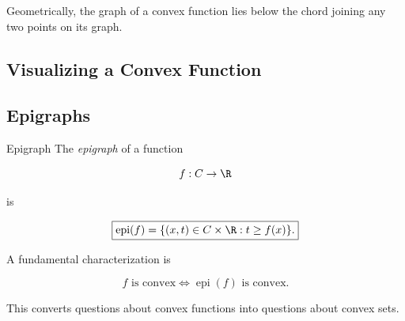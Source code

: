 Geometrically, the graph of a convex function lies below the chord joining
any two points on its graph.

\subsection{Visualizing a Convex Function}
\label{subsec:visualizing-convex-function}

\begin{centereddiagram}
\end{centereddiagram}

\subsection{Epigraphs}
\label{subsec:convex-epigraphs}

\begin{definitionbox}{Epigraph}
The \emph{epigraph} of a function

\[
f:C\to\R
\]

is

\[
\boxed{
\operatorname{epi}(f)
=
\{
(x,t)\in C\times\R:
t\geq f(x)
\}.
}
\]
\end{definitionbox}

A fundamental characterization is

\[
\boxed{
f\text{ is convex}
\iff
\operatorname{epi}(f)\text{ is convex}.
}
\]

This converts questions about convex functions into questions about convex
sets.


